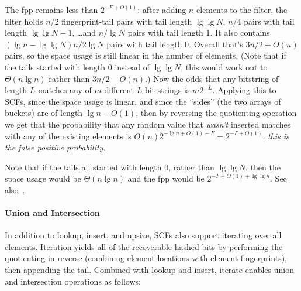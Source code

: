 \documentclass[letterpaper,twocolumn,10pt]{article}
\newcommand{\ints}{\mathbb{Z}}
\newcommand{\TCF}{SCF}
\newcommand{\TCF}{TCF}
\begin{document}
The fpp remains less than $2^{-F+O(1)}$:
after adding $n$ elements to the filter, the filter holds $n/2$ fingerprint-tail pairs with tail length $\lg \lg N$, $n/4$ pairs with tail length $\lg \lg N - 1$, \dots and $n/\lg N$ pairs with tail length 1.
It also contains $(\lg n - \lg \lg N)  n / 2 \lg N$ pairs with tail length 0.
Overall that's $3n/2 - O(n)$ pairs, so the space usage is still linear in the number of elements.
(Note that if the tails started with length 0 instead of $\lg \lg N$, this would work out to $\Theta(n \lg n)$ rather than $3n/2 - O(n)$.)
Now the odds that any bitstring of length $L$ matches any of $m$ different $L$-bit strings is $m 2^{-L}$.
Applying this to \TCF{}s, since the space usage is linear, and since the ``sides'' (the two arrays of buckets) are of length $\lg n - O(1)$, then by reversing the quotienting operation we get that the probability that any random value that {\em wasn't} inserted matches with any of the existing elements is $O(n) 2^{-\lg n + O(1) - F} = 2^{-F+O(1)}$; {\em this is the false positive probability}.

Note that if the tails all started with length 0, rather than $\lg \lg N$, then the space usage would be $\Theta(n \lg n)$ and the fpp would be $2^{-F+O(1) + \lg \lg n}$.
See also~\cite{psw}.



\paragraph{Union and Intersection}
In addition to lookup, insert, and upsize, \TCF{}s also support iterating over all elements.
Iteration yields all of the recoverable hashed bits by performing the quotienting in reverse (combining element locations with element fingerprints), then appending the tail. %
Combined with lookup and insert, iterate enables union and intersection operations as follows:
\end{document}
